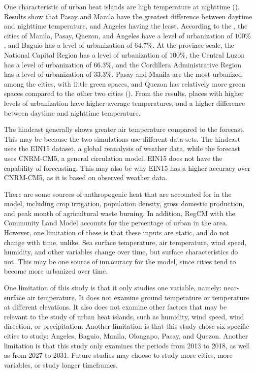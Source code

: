 	One characteristic of urban heat islands are high temperature at nighttime (\cite{Oke2017urban}).
	Results show that Pasay and Manila have the greatest difference between daytime and nighttime temperature, and Angeles having the least.
	According to the \textcite{PSA2022}, 
		the cities of Manila, Pasay, Quezon, and Angeles have a level of urbanization of $\si{100}{\%}$,
		and
		Baguio has a level of urbanization of $\si{64.7}{\%}$.
	At the province scale,
		the National Capital Region has a level of urbanization of $\si{100}{\%}$,		
		the Central Luzon has a level of urbanization of $\si{66.3
		}{\%}$,
		and
		the Cordillera Administrative Region has a level of urbanization of $\si{33.3}{\%}$.
	Pasay and Manila are the most urbanized among the cities, with little green spaces,
	and Quezon has relatively more green spaces compared to the other two cities (\cite{Bilang2022}).
	From the results, places with higher levels of urbanization have higher average temperatures, and a higher difference between daytime and nighttime temperature.

	The hindcast generally shows greater air temperature compared to the forecast.
	This may be because the two simulations use different data sets.
	The hindcast uses the EIN15 dataset, a global reanalysis of weather data, while the forecast uses CNRM-CM5, a general circulation model.
	EIN15 does not have the capability of forecasting.
	This may also be why EIN15 has a higher accuracy over CNRM-CM5, as it is based on observed weather data.

	There are some sources of anthropogenic heat that are accounted for in the model, including crop irrigation, population density, gross domestic production, and peak month of agricultural waste burning.
	In addition, RegCM with the Community Land Model accounts for the percentage of urban in the area.
	However, one limitation of these is that these inputs are static, and do not change with time, unlike.
	Sea surface temperature, air temperature, wind speed, humidity, and other variables change over time, but surface characteristics do not.
	This may be one source of innacuracy for the model, since cities tend to become more urbanized over time.
	
	One limitation of this study is that it only studies one variable, namely: near-surface air temperature.
	It does not examine ground temperature or temperature at different elevations.
	It also does not examine other factors that may be relevant to the study of urban heat islands, such as humidity, wind speed, wind direction, or precipitation. 
	Another limitation is that this study chose six specific cities to study: Angeles, Baguio, Manila, Olongapo, Pasay, and Quezon.
	Another limitation is that this study only examines the periods from 2013 to 2018, as well as from 2027 to 2031.
	Future studies may choose to study more cities, more variables, or study longer timeframes.
	
